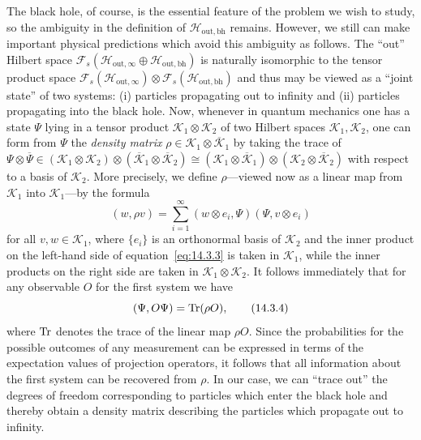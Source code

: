The black hole, of course, is the essential feature of the problem we wish to study,
so the ambiguity in the definition of \(\mathcal H_{\mathrm{out},\mathrm{bh}}\)
remains. However, we still can make important physical predictions which avoid this
ambiguity as follows. The ``out'' Hilbert space
\(\mathcal F_s(\mathcal H_{\mathrm{out},\infty}\oplus
\mathcal H_{\mathrm{out},\mathrm{bh}})\) is naturally isomorphic to the tensor
product space
\(\mathcal F_s(\mathcal H_{\mathrm{out},\infty})\otimes
\mathcal F_s(\mathcal H_{\mathrm{out},\mathrm{bh}})\) and thus may be viewed as
a ``joint state'' of two systems: (i) particles propagating out to infinity and
(ii) particles propagating into the black hole. Now, whenever in quantum mechanics
one has a state \(\Psi\) lying in a tensor product
\(\mathcal K_1\otimes\mathcal K_2\) of two Hilbert spaces
\(\mathcal K_1,\mathcal K_2\), one can form from \(\Psi\) the \emph{density matrix}
\(\rho\in\mathcal K_1\otimes\overline{\mathcal K}_1\) by taking the trace of
\(\Psi\otimes\overline\Psi\in
(\mathcal K_1\otimes\mathcal K_2)\otimes
(\overline{\mathcal K}_1\otimes\overline{\mathcal K}_2)
\cong(\mathcal K_1\otimes\overline{\mathcal K}_1)\otimes
(\mathcal K_2\otimes\overline{\mathcal K}_2)\) with respect to a basis of
\(\mathcal K_2\). More precisely, we define \(\rho\)---viewed now as a linear map
from \(\mathcal K_1\) into \(\mathcal K_1\)---by the formula
\begin{equation}
  (w,\rho v)=\sum_{i=1}^{\infty}
  (w\otimes e_i,\Psi)(\Psi,v\otimes e_i)
  \tag{14.3.3}\label{eq:14.3.3}
\end{equation}
for all \(v,w\in\mathcal K_1\), where \(\{e_i\}\) is an orthonormal basis of
\(\mathcal K_2\) and the inner product on the left-hand side of
equation~\eqref{eq:14.3.3} is taken in \(\mathcal K_1\), while the inner products
on the right side are taken in \(\mathcal K_1\otimes\mathcal K_2\). It follows
immediately that for any observable \(O\) for the first system we have
\begin{equation}
  (\Psi,O\Psi)=\operatorname{Tr}(\rho O),
  \tag{14.3.4}\label{eq:14.3.4}
\end{equation}
where \(\operatorname{Tr}\) denotes the trace of the linear map \(\rho O\). Since the probabilities
for the possible outcomes of any measurement can be expressed in terms of the
expectation values of projection operators, it follows that all information about the
first system can be recovered from \(\rho\). In our case, we can ``trace out'' the
degrees of freedom corresponding to particles which enter the black hole and thereby
obtain a density matrix describing the particles which propagate out to infinity.
